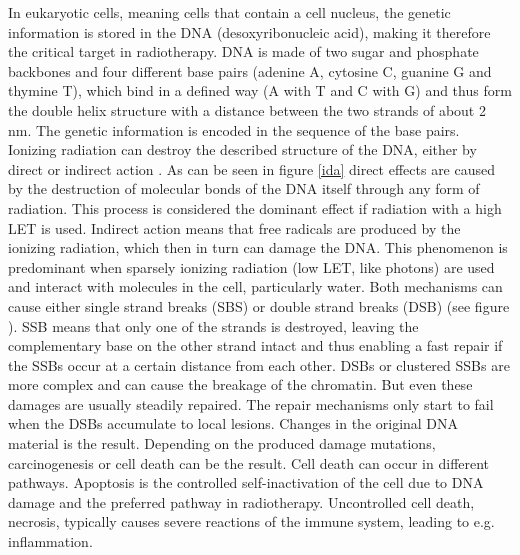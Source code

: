 In eukaryotic cells, meaning cells that contain a cell nucleus, the genetic information is stored in the DNA (desoxyribonucleic acid), 
making it therefore the critical target in radiotherapy. DNA is made of two sugar and phosphate backbones and four different base pairs 
(adenine A, cytosine C, guanine G and thymine T), which bind in a defined way (A with T and C with G) and thus form the double helix 
structure with a distance between the two strands of about 2 nm. The genetic information is encoded in the sequence of the base pairs. 
Ionizing radiation can destroy the described structure of the DNA, either by direct or indirect action \cite{Hal06}.\newline
\newline
As can be seen in figure \ref{ida} direct effects are caused by the destruction of molecular bonds of the DNA itself 
through any form of radiation. This process is considered the dominant effect if radiation with a high LET is used. Indirect action means 
that free radicals are produced by the ionizing radiation, which then in turn can damage the DNA. 
This phenomenon is predominant when sparsely ionizing radiation (low LET, like photons) are used and interact with molecules in the cell, 
particularly water.\newline
\newline
Both mechanisms can cause either single strand breaks (SBS) or double strand breaks (DSB) (see figure \label{ida}). SSB means that only 
one of the strands is destroyed, leaving the complementary base on the other strand intact and thus enabling a fast repair if the SSBs 
occur at a certain distance from each other. DSBs or clustered SSBs are more complex and can cause the breakage of the chromatin. But even 
these damages are usually steadily repaired. The repair mechanisms only start to fail when the DSBs accumulate to local lesions. Changes 
in the original DNA material is the result. Depending on the produced damage mutations, carcinogenesis or cell death can be the 
result. Cell death can occur in different pathways. Apoptosis is the controlled self-inactivation of the cell due to DNA damage and the preferred 
pathway in radiotherapy. Uncontrolled cell death, necrosis, typically causes severe reactions of the immune system, leading to e.g. 
inflammation.

